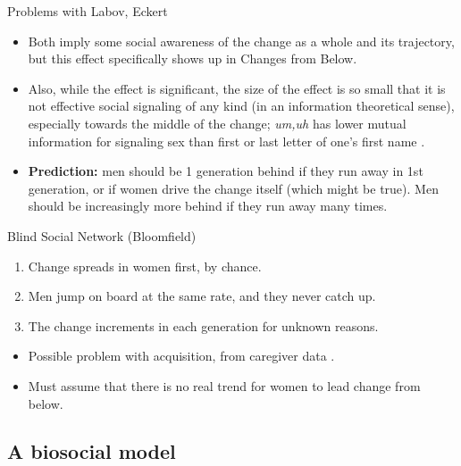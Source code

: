 \documentclass[hyperref={pdfpagelabels=false}]{beamer}
\begin{document}
\begin{frame}{Problems with Labov, Eckert}
	\begin{itemize}
	\item Both imply some social awareness of the change as a whole and its trajectory, but this effect specifically shows up in Changes from Below.
	\item Also, while the effect is significant, the size of the effect is so small that it is not effective social signaling of any kind (in an information theoretical sense), especially towards the middle of the change; \textsl{um,uh} has lower mutual information for signaling sex than first or last letter of one's first name \citep{fruehwald2015}.
	\item \textbf{Prediction:} men should be 1 generation behind if they run away in 1st generation, or if women drive the change itself (which might be true). Men should be increasingly more behind if they run away many times.
	\end{itemize}
\end{frame}


\begin{frame}{Blind Social Network (Bloomfield)}
	\begin{enumerate}
	\item Change spreads in women first, by chance.
	\item Men jump on board at the same rate, and they never catch up.
	\item The change increments in each generation for unknown reasons.
	\end{enumerate}
	\begin{itemize}
	\item Possible problem with acquisition, from caregiver data \citep{smithetal2007}.
	\item Must assume that there is no real trend for women to lead change from below.
	\end{itemize}
\end{frame}




\subsection{A biosocial model}
\end{document}
